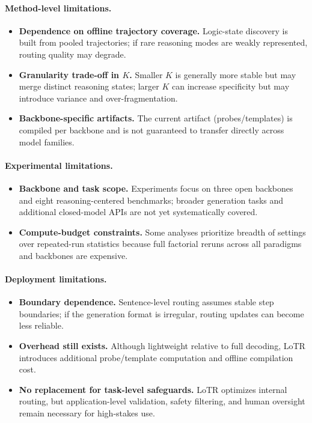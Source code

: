 \paragraph{Method-level limitations.}
\begin{itemize}[leftmargin=1.6em]
    \item \textbf{Dependence on offline trajectory coverage.} Logic-state discovery is built from pooled trajectories; if rare reasoning modes are weakly represented, routing quality may degrade.
    \item \textbf{Granularity trade-off in \(K\).} Smaller \(K\) is generally more stable but may merge distinct reasoning states; larger \(K\) can increase specificity but may introduce variance and over-fragmentation.
    \item \textbf{Backbone-specific artifacts.} The current artifact (probes/templates) is compiled per backbone and is not guaranteed to transfer directly across model families.
\end{itemize}

\paragraph{Experimental limitations.}
\begin{itemize}[leftmargin=1.6em]
    \item \textbf{Backbone and task scope.} Experiments focus on three open backbones and eight reasoning-centered benchmarks; broader generation tasks and additional closed-model APIs are not yet systematically covered.
    \item \textbf{Compute-budget constraints.} Some analyses prioritize breadth of settings over repeated-run statistics because full factorial reruns across all paradigms and backbones are expensive.
\end{itemize}

\paragraph{Deployment limitations.}
\begin{itemize}[leftmargin=1.6em]
    \item \textbf{Boundary dependence.} Sentence-level routing assumes stable step boundaries; if the generation format is irregular, routing updates can become less reliable.
    \item \textbf{Overhead still exists.} Although lightweight relative to full decoding, LoTR introduces additional probe/template computation and offline compilation cost.
    \item \textbf{No replacement for task-level safeguards.} LoTR optimizes internal routing, but application-level validation, safety filtering, and human oversight remain necessary for high-stakes use.
\end{itemize}

